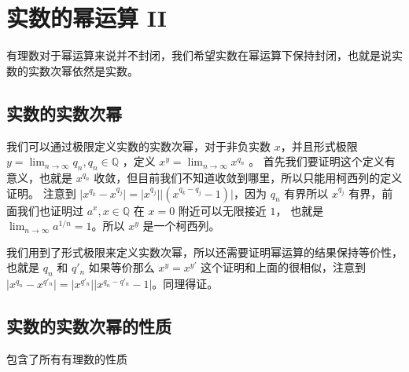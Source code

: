 \section{实数的幂运算 II}

有理数对于幂运算来说并不封闭，我们希望实数在幂运算下保持封闭，也就是说实数的实数次幂依然是实数。

\subsection{实数的实数次幂}

我们可以通过极限定义实数的实数次幂，对于非负实数 $x$，并且形式极限 $y = \lim_{n \to \infty }q_n, q_n \in \mathbb{Q}$ ，定义 $x^y = \lim_{n \to \infty} x^{q_n}$ 。
首先我们要证明这个定义有意义，也就是 $x^{q_n}$ 收敛，但目前我们不知道收敛到哪里，所以只能用柯西列的定义证明。
注意到 $\lvert x^{q_k} - x^{q_j} \rvert = \lvert x^{q_j} \rvert \lvert (x^{q_k-q_j}-1) \rvert$，因为 $q_n$ 有界所以 $x^{q_j}$ 有界，前面我们也证明过 $a^x, x \in \mathbb{Q} $ 在 $x = 0$
附近可以无限接近 $1$， 也就是 $\lim_{n \to \infty} a^{1/n} = 1$。所以 $x^y$ 是一个柯西列。

我们用到了形式极限来定义实数次幂，所以还需要证明幂运算的结果保持等价性，也就是 $q_n$ 和  $q'_n$ 如果等价那么 $x^y = x^{y'}$
这个证明和上面的很相似，注意到$ \lvert x^{q_n} -x ^{q'_n} \rvert = \lvert x^{q'_n} \rvert \lvert x^{q_n -q'_n}-1\rvert$。同理得证。

\subsection{实数的实数次幂的性质}

包含了所有有理数的性质

